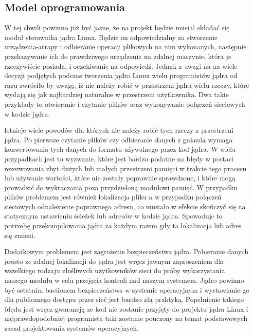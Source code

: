 \documentclass[10pt]{scrartcl}
\begin{document}
\subsection{Model oprogramowania}
\label{softmodel}

W tej chwili powinno już być jasne, że na projekt będzie musiał składać się moduł sterownika jądra Linux. Będzie on odpowiedzialny za stworzenie urządzenia-atrapy i odbieranie operacji plikowych na nim wykonanych, następnie przekazywanie ich do prawdziwego urządzenia na zdalnej maszynie, która je rzeczywiście posiada, i oczekiwanie na odpowiedź. Jednak z uwagi na na wiele decyzji podjętych podczas tworzenia jądra Linux wielu programistów jądra od razu zwróciło by uwagę, iż nie należy robić w przestrzeni jądra wielu rzeczy, które wydają się jak najbardziej naturalne w przestrzeni użytkownika. Dwa takie przykłady to otwieranie i czytanie plików oraz wykonywanie połączeń sieciowych w kodzie jądra.

Istnieje wiele powodów dla których nie należy robić tych rzeczy z przestrzeni jądra. Po pierwsze czytanie plików czy odbieranie danych z gniazda wymaga konwertowania tych danych do formatu używalnego przez kod jądra. W wielu przypadkach jest to wyzwanie, które jest bardzo podatne na błędy w postaci rezerwowania zbyt dużych lub małych przestrzeni pamięci w trakcie tego procesu lub używanie wartości, które nie zostały poprawnie sprawdzone, i które mogą prowadzić do wykraczania poza przydzieloną modułowi pamięć. W przypadku plików problemem jest również lokalizacja pliku a w przypadku połączeń sieciowych odnalezienie poprawnego adresu, co musiało w efekcie skończyć się na statycznym ustawieniu ścieżek lub adresów w kodzie jądra. Spowoduje to potrzebę przekompilowania jądra za każdym razem gdy ta lokalizacja lub adres się zmieni.

Dodatkowym problemem jest zagrożenie bezpieczeństwa jądra. Pobieranie danych prosto ze zdalnej lokalizacji do jądra jest wręcz jawnym zaproszeniem dla wszelkiego rodzaju złośliwych użytkowników sieci do próby wykorzystania naszego modułu w celu przejęcia kontroli nad naszym systemem. Jądro powinno być ostatnim bastionem bezpieczeństwa w systemie operacyjnym i wystawianie go dla publicznego dostępu przez sieć jest bardzo złą praktyką. Popełnienie takiego błędu jest wręcz gwarancją ze kod nie zostanie przyjęty do projektu jądra Linux i najprawdopodobniej programista taki zostanie pouczony na temat podstawowych zasad projektowania systemów operacyjnych.
\end{document}
